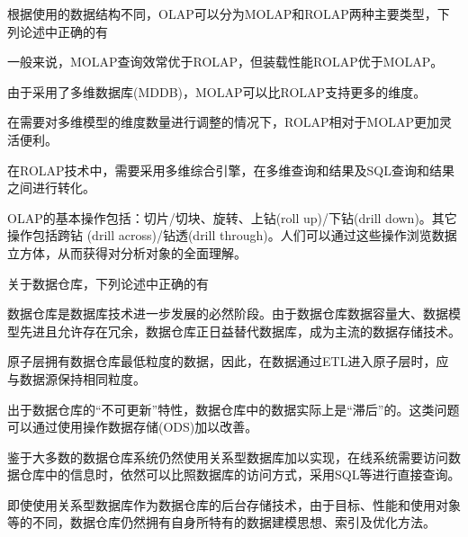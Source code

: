 \begin{problem}
根据使用的数据结构不同，OLAP可以分为MOLAP和ROLAP两种主要类型，下列论述中正确的有
\myline
\begin{compactenum}[A.]
    \item 一般来说，MOLAP查询效常优于ROLAP，但装载性能ROLAP优于MOLAP。
    \item 由于采用了多维数据库(MDDB)，MOLAP可以比ROLAP支持更多的维度。
    \item 在需要对多维模型的维度数量进行调整的情况下，ROLAP相对于MOLAP更加灵活便利。
    \item 在ROLAP技术中，需要采用多维综合引擎，在多维查询和结果及SQL查询和结果之间进行转化。
    \item OLAP的基本操作包括：切片/切块、旋转、上钻(roll up)/下钻(drill down)。其它操作包括跨钻 (drill across)/钻透(drill through)。人们可以通过这些操作浏览数据立方体，从而获得对分析对象的全面理解。
\end{compactenum}
\end{problem}


\begin{problem}
关于数据仓库，下列论述中正确的有
\myline
\begin{compactenum}[A.]
    \item 数据仓库是数据库技术进一步发展的必然阶段。由于数据仓库数据容量大、数据模型先进且允许存在冗余，数据仓库正日益替代数据库，成为主流的数据存储技术。
    \item 原子层拥有数据仓库最低粒度的数据，因此，在数据通过ETL进入原子层时，应与数据源保持相同粒度。
    \item 出于数据仓库的“不可更新”特性，数据仓库中的数据实际上是“滞后”的。这类问题可以通过使用操作数据存储(ODS)加以改善。
    \item 鉴于大多数的数据仓库系统仍然使用关系型数据库加以实现，在线系统需要访问数据仓库中的信息时，依然可以比照数据库的访问方式，采用SQL等进行直接查询。
    \item 即使使用关系型数据库作为数据仓库的后台存储技术，由于目标、性能和使用对象等的不同，数据仓库仍然拥有自身所特有的数据建模思想、索引及优化方法。
\end{compactenum}
\end{problem}


